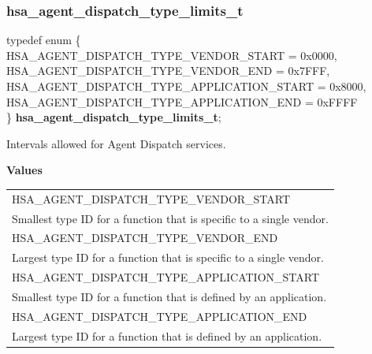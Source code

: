 \documentclass[final,oneside]{book}
\newcommand{\reftyp}[1]{#1}
\newcommand{\refenu}[1]{\reftyp{#1}}
\newenvironment{mylongtable}{\rowcolors{0}{lightgray}{lightgray}\longtable} {
\endlongtable}
\begin{document}
\subsubsection{hsa_\-agent_\-dispatch_\-type_\-limits_\-t}
\vspace{-5.5mm}\begin{mylongtable}{@{}p{\textwidth}}
\rule{0pt}{3ex}typedef enum \{\\\hspace{1.7em}\hypertarget{group__aql_1ggab64e4c92a8097da1aa66a727eb7d1c58a39bcab1d019ef23873c08fcfc7f461ec}{\refenu{HSA_\-AGENT_\-DISPATCH_\-TYPE_\-VENDOR_\-START}} = 0x0000,\\
\hspace{1.7em}\hypertarget{group__aql_1ggab64e4c92a8097da1aa66a727eb7d1c58a01d2be573e7f9c7e54789bb7de648b3e}{\refenu{HSA_\-AGENT_\-DISPATCH_\-TYPE_\-VENDOR_\-END}} = 0x7FFF,\\
\hspace{1.7em}\hypertarget{group__aql_1ggab64e4c92a8097da1aa66a727eb7d1c58ab755582ca7c6f07386374d879f69a7b5}{\refenu{HSA_\-AGENT_\-DISPATCH_\-TYPE_\-APPLICATION_\-START}} = 0x8000,\\
\hspace{1.7em}\hypertarget{group__aql_1ggab64e4c92a8097da1aa66a727eb7d1c58a212104d78e749971f500b6b2989c0813}{\refenu{HSA_\-AGENT_\-DISPATCH_\-TYPE_\-APPLICATION_\-END}} = 0xFFFF\\
\} \hypertarget{group__aql_1gab64e4c92a8097da1aa66a727eb7d1c58}{\textbf{hsa_\-agent_\-dispatch_\-type_\-limits_\-t}};\rule[-2ex]{0pt}{0pt}\end{mylongtable}
\vspace{-5mm}Intervals allowed for Agent Dispatch services.

\noindent\textbf{Values}\\[-5mm]
\begin{longtable}{@{\hspace{2em}}p{\linewidth-2em}}
\hspace{-2em}\refenu{HSA_\-AGENT_\-DISPATCH_\-TYPE_\-VENDOR_\-START}\\Smallest type ID for a function that is specific to a single vendor.\\[2mm]
\hspace{-2em}\refenu{HSA_\-AGENT_\-DISPATCH_\-TYPE_\-VENDOR_\-END}\\Largest type ID for a function that is specific to a single vendor.\\[2mm]
\hspace{-2em}\refenu{HSA_\-AGENT_\-DISPATCH_\-TYPE_\-APPLICATION_\-START}\\Smallest type ID for a function that is defined by an application.\\[2mm]
\hspace{-2em}\refenu{HSA_\-AGENT_\-DISPATCH_\-TYPE_\-APPLICATION_\-END}\\Largest type ID for a function that is defined by an application.
\end{longtable}
\end{document}

